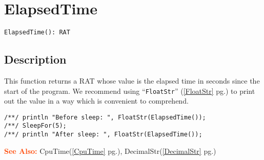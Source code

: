 \documentclass[a4paper]{mybook}
\newenvironment{command}{}{} %
\newcommand\SeeAlso{\par\textcolor{OrangeRed}{\textbf{\large See Also: }}}
\begin{document}
\section{ElapsedTime}
\label{ElapsedTime}
\begin{command} %


\begin{Verbatim}[label=syntax, rulecolor=\color{MidnightBlue},
frame=single]
ElapsedTime(): RAT
\end{Verbatim}


\subsection*{Description}

This function returns a RAT whose value is the elapsed time in
seconds since the start of the program.  We recommend using ``\verb&FloatStr&'' (\ref{FloatStr} pg.\pageref{FloatStr})
to print out the value in a way which is convenient to comprehend.
\begin{Verbatim}[label=example, rulecolor=\color{PineGreen}, frame=single]
/**/ println "Before sleep: ", FloatStr(ElapsedTime());
/**/ SleepFor(5);
/**/ println "After sleep: ", FloatStr(ElapsedTime());
\end{Verbatim}


\SeeAlso %
  CpuTime(\ref{CpuTime} pg.\pageref{CpuTime}), 
    DecimalStr(\ref{DecimalStr} pg.\pageref{DecimalStr})
\end{command} %
\end{document}
